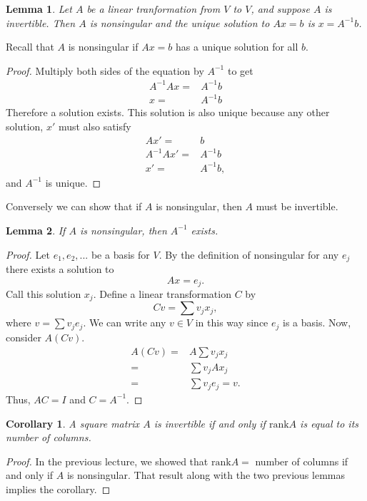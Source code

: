 \documentclass[12pt,reqno]{amsart}
\newcommand{\rank}{\mathrm{rank}}
\newtheorem{corollary}{Corollary}[section]
\newtheorem{lemma}{Lemma}[section]
\theoremstyle{definition}
\begin{document}
\begin{lemma}
  Let $A$ be a linear tranformation from $V$ to $V$, and suppose $A$
  is invertible. Then $A$ is nonsingular and the unique solution to
  $Ax = b$ is $x = A^{-1} b$. 
\end{lemma}
Recall that $A$ is nonsingular if  $Ax = b$ has a unique solution for
all $b$.
\begin{proof}
  Multiply both sides of the equation by $A^{-1}$ to get
  \begin{align*}
    A^{-1} A x =  & A^{-1} b \\
    x = & A^{-1} b
  \end{align*}
  Therefore a solution exists. This solution is also unique because
  any other solution, $x'$ must also satisfy 
  \begin{align*}
    A x' =  &  b \\
    A^{-1} A x'= & A^{-1} b \\
    x' = & A^{-1} b,
  \end{align*}
  and $A^{-1}$ is unique. 
\end{proof}
Conversely we can show that if $A$ is nonsingular, then $A$ must be invertible.
\begin{lemma}
  If $A$ is nonsingular, then $A^{-1}$ exists.
\end{lemma}
\begin{proof}
  Let $e_1, e_2, ... $ be a basis for $V$.  By the definition of
  nonsingular for any $e_j$ there exists a solution to 
  \[ A x = e_j. \]
  Call this solution $x_j$.  Define a linear transformation $C$ by 
  \[ C v = \sum v_j x_j, \]
  where $v = \sum v_j e_j $. We can write any $v \in V$ in this way
  since $e_j$ is a basis. Now, consider $A(Cv)$.
  \begin{align*}
    A (C v) = & A \sum v_j x_j \\
    = & \sum v_j A x_j \\
    = & \sum v_j e_j = v.
  \end{align*}
  Thus, $AC = I$ and $C = A^{-1}$.
\end{proof}
\begin{corollary}
  A square matrix $A$ is invertible if and only if $\rank A$ is equal
  to its number of columns.
\end{corollary}
\begin{proof}
  In the previous lecture, we showed that $\rank A = $ number of
  columns if and only if $A$ is nonsingular. That result along with
  the two previous lemmas implies the corollary.
\end{proof}
\end{document}
